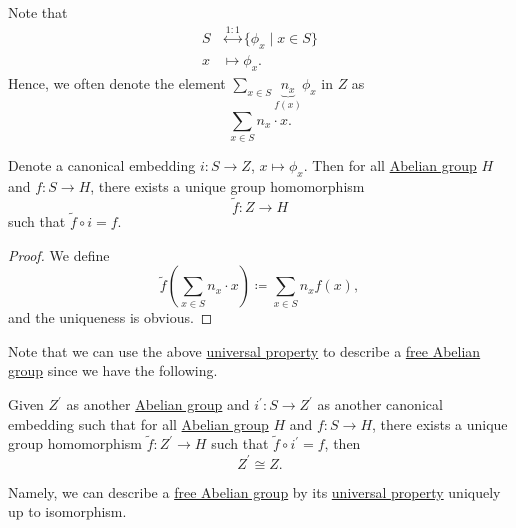 \begin{note}
	Note that
	\[
		\begin{split}
			S &\overset{1:1}{\longleftrightarrow} \{\phi _{x} \mid x\in S\}\\
			x &\mapsto \phi _{x}.
		\end{split}
	\]
	Hence, we often denote the element \(\sum\limits_{x\in S}^{} \underbrace{n_{x}}_{f(x)} \phi _{x} \) in \(Z\) as
	\[
		\sum\limits_{x\in S}n_{x} \cdot x.
	\]
\end{note}
\begin{theorem}\label{thm:universal-property-of-free-Abelian-group-generated-by-a-set}
	Denote a canonical embedding \(i\colon S\to Z\), \(x\mapsto \phi _{x} \). Then for all \hyperref[def:Abelian-group]{Abelian group} \(H\) and \(f\colon S\to H\), there exists a unique group homomorphism
	\[
		\widetilde{f} \colon Z\to H
	\]
	such that \(\widetilde{f} \circ i = f\).
\end{theorem}
\begin{proof}
	We define
	\[
		\widetilde{f} \left(\sum\limits_{x\in S}^{} n_{x} \cdot x\right)\coloneqq \sum\limits_{x\in S}n_{x} f(x),
	\]
	and the uniqueness is obvious.
\end{proof}

Note that we can use the above \hyperref[thm:universal-property-of-free-Abelian-group-generated-by-a-set]{universal property} to describe a
\hyperref[def:free-Abelian-group]{free Abelian group} since we have the following.
\begin{proposition}
	Given \(Z^\prime \) as another \hyperref[def:Abelian-group]{Abelian group} and \(i^\prime \colon S\to Z^\prime \) as another canonical embedding such that for all \hyperref[def:Abelian-group]{Abelian group} \(H\)
	and \(f\colon S\to H\), there exists a unique group homomorphism \(\widetilde{f} \colon Z^\prime \to H\) such that \(\widetilde{f} \circ i^\prime = f\), then
	\[
		Z^\prime \cong Z.
	\]
\end{proposition}

Namely, we can describe a \hyperref[def:free-Abelian-group]{free Abelian group} by its \hyperref[thm:universal-property-of-free-Abelian-group-generated-by-a-set]{universal property}
uniquely up to isomorphism.

